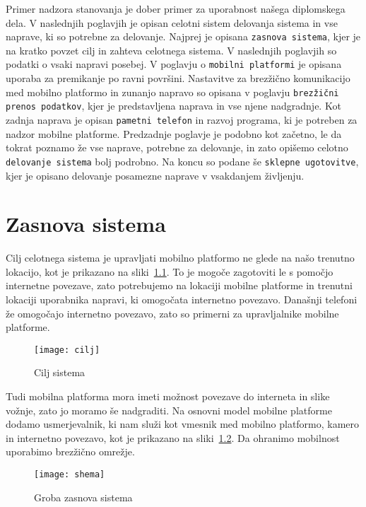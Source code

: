 \documentclass[a4paper, 12pt]{book}
\begin{document}
Primer nadzora stanovanja je dober primer za uporabnost našega di\-plom\-ske\-ga dela. V naslednjih poglavjih je opisan celotni sistem delovanja sistema in vse naprave, ki so potrebne za delovanje. Najprej je opisana {\tt zasnova sistema}, kjer je na kratko povzet cilj in zahteva celotnega sistema. V naslednjih poglavjih so podatki o vsaki napravi posebej. V poglavju o {\tt mobilni platformi} je opisana uporaba za premikanje po ravni površini. Nastavitve za brezžično komunikacijo med mobilno platformo in zunanjo napravo so opisana v poglavju {\tt brezžični prenos podatkov}, kjer je predstavljena naprava in vse njene nadgradnje. Kot zadnja naprava je opisan {\tt pametni telefon} in razvoj programa, ki je potreben za nadzor mobilne platforme. Predzadnje poglavje je podobno kot začetno, le da tokrat poznamo že vse naprave, potrebne za delovanje, in zato opišemo celotno {\tt delovanje sistema} bolj podrobno. Na koncu so podane še {\tt sklepne ugotovitve}, kjer je opisano delovanje posamezne naprave v vsakdanjem življenju. 

\chapter{Zasnova sistema}

Cilj celotnega sistema je upravljati mobilno platformo ne glede na našo trenutno lokacijo, kot je prikazano na sliki~\ref{diaCilj}. To je mogoče zagotoviti le s pomočjo internetne povezave, zato potrebujemo na lokaciji mobilne platforme in trenutni lokaciji uporabnika napravi, ki omogočata internetno povezavo. Današnji telefoni že omogočajo internetno povezavo, zato so primerni za upravljalnike mobilne platforme.

\begin{figure}[h]
	\centering
	\texttt{[image: cilj]}
	\caption{Cilj sistema}
	\label{diaCilj}
\end{figure}

Tudi mobilna platforma mora imeti možnost povezave do interneta in slike vožnje, zato jo moramo še nadgraditi. Na osnovni model mobilne platforme dodamo usmerjevalnik, ki nam služi kot vmesnik med mobilno platformo, kamero in internetno povezavo, kot je prikazano na sliki~\ref{diaShema}. Da ohranimo mobilnost uporabimo brezžično omrežje.

\begin{figure}[h]
	\centering
	\texttt{[image: shema]}
	\caption{Groba zasnova sistema}
	\label{diaShema}
\end{figure}
\end{document}

